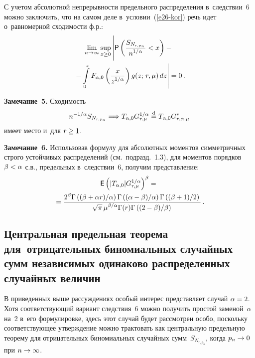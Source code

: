 \begin{multicols}{2}
С учетом абсолютной непрерывности предельного распределения 
в~следствии~6 можно заключить, что на самом деле в~условии~(\ref{e26-kor}) речь
идет о~равномерной сходимости ф.р.:
\begin{multline*}
\lim\limits_{n\to\infty}\sup\limits_{x\ge0}\left\vert 
\vphantom{\int\limits_{0}^{x}}
{\sf P}
\left(\fr{S_{N_{r,p_n}}}{n^{1/\alpha}}<x\right)-{}\right.\\
\left.{}-\int\limits_{0}^{x}F_{\alpha,0}\left(\fr{x}{z^{1/\alpha}}\right)g(z;\,r,\mu)\,dz
\right\vert=0\,.
\end{multline*}

\smallskip

\noindent
\textbf{Замечание~5.} Сходимость
$$
n^{-1/\alpha}S_{N_{r,p_n}}\Longrightarrow T_{\alpha,0}
G_{r,\mu}^{1/\alpha}\stackrel{\mathrm{d}}{=} T_{\alpha,0} G^*_{r,\alpha,\mu}
$$ 
имеет
место и~для $r\hm\ge 1$.

\smallskip

\noindent
\textbf{Замечание~6.} Использовав формулу для абсолютных моментов
симметричных строго устойчивых распределений (см.\ подразд.~1.3), для
моментов порядков $\beta\hm<\alpha$ с.в., предельных в~следствии~6,
получим представление:
\begin{multline*}
{\sf E}\left(|T_{\alpha,0}|G_{r,\mu}^{1/\alpha}\right)^{\beta}={}\\
{}=
\displaystyle\frac{\displaystyle 2^{\beta}\Gamma\left(({\beta+\alpha r})/{\alpha}\right)\Gamma
\left(({\alpha-\beta})/{\alpha}\right)\Gamma\left(({\beta+1})/{2}\right)\mathstrut}{\displaystyle \sqrt{\pi}\,\mu^{\beta/\alpha}\Gamma(r)\Gamma\left(({2-\beta})/{\beta}\right)\mathstrut}\,.
\end{multline*}


\subsection{Центральная предельная теорема для~отрицательных биномиальных 
случайных сумм независимых одинаково распределенных
случайных величин}

В приведенных выше рассуждениях особый интерес представляет случай
$\alpha\hm=2$. Хотя соответствующий вариант следствия~6 можно получить
прос\-той заменой~$\alpha$ на~2 в~его формулировке, здесь этот случай
будет рассмотрен особо, поскольку соответствующее утверждение можно
трактовать как центральную предельную теорему для отрицательных
биномиальных случайных сумм~$S_{N_{r,p_n}}$, когда
$p_n\hm\to0$ при $n\hm\to\infty$.


\end{multicols}
